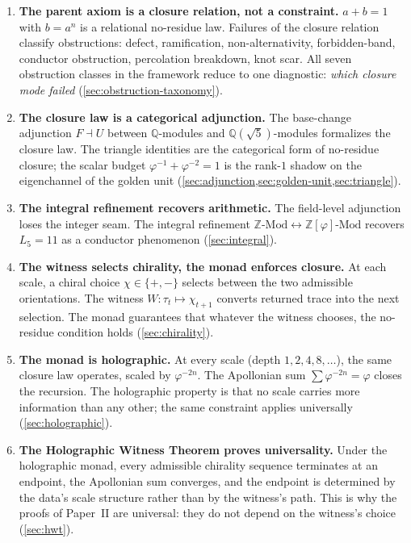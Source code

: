 \documentclass[11pt,a4paper]{article}
\theoremstyle{plain}
\theoremstyle{definition}
\theoremstyle{remark}
\numberwithin{equation}{section}
\providecommand{\Z}{\mathbb{Z}}
\providecommand{\Q}{\mathbb{Q}}
\providecommand{\vp}{\varphi}
\providecommand{\Lk}{L}
\begin{document}
\begin{enumerate}[label=(\arabic*)]
\item \textbf{The parent axiom is a closure relation, not a
  constraint.}  $a + b = 1$ with $b = a^n$ is a relational
  no-residue law.  Failures of the closure relation classify
  obstructions: defect, ramification, non-alternativity,
  forbidden-band, conductor obstruction, percolation breakdown,
  knot scar.  All seven obstruction classes in the framework
  reduce to one diagnostic: \emph{which closure mode failed}
  (\cref{sec:obstruction-taxonomy}).

\item \textbf{The closure law is a categorical adjunction.}  The
  base-change adjunction $F \dashv U$ between $\Q$-modules and
  $\Q(\sqrt 5)$-modules formalizes the closure law.  The
  triangle identities are the categorical form of no-residue
  closure; the scalar budget $\vp^{-1} + \vp^{-2} = 1$ is the
  rank-$1$ shadow on the eigenchannel of the golden unit
  (\cref{sec:adjunction,sec:golden-unit,sec:triangle}).

\item \textbf{The integral refinement recovers arithmetic.}  The
  field-level adjunction loses the integer seam.  The integral
  refinement $\Z\text{-Mod} \leftrightarrow \Z[\vp]\text{-Mod}$
  recovers $\Lk_5 = 11$ as a conductor phenomenon
  (\cref{sec:integral}).

\item \textbf{The witness selects chirality, the monad enforces
  closure.}  At each scale, a chiral choice $\chi \in \{+, -\}$
  selects between the two admissible orientations.  The witness
  $W \colon \tau_t \mapsto \chi_{t+1}$ converts returned trace
  into the next selection.  The monad guarantees that whatever
  the witness chooses, the no-residue condition holds
  (\cref{sec:chirality}).

\item \textbf{The monad is holographic.}  At every scale (depth
  $1, 2, 4, 8, \ldots$), the same closure law operates, scaled
  by $\vp^{-2n}$.  The Apollonian sum $\sum \vp^{-2n} = \vp$
  closes the recursion.  The holographic property is that no
  scale carries more information than any other; the same
  constraint applies universally
  (\cref{sec:holographic}).

\item \textbf{The Holographic Witness Theorem proves
  universality.}  Under the holographic monad, every admissible
  chirality sequence terminates at an endpoint, the Apollonian
  sum converges, and the endpoint is determined by the data's
  scale structure rather than by the witness's path.  This is
  why the proofs of Paper~II are universal: they do not depend
  on the witness's choice (\cref{sec:hwt}).


\end{enumerate}
\end{document}
